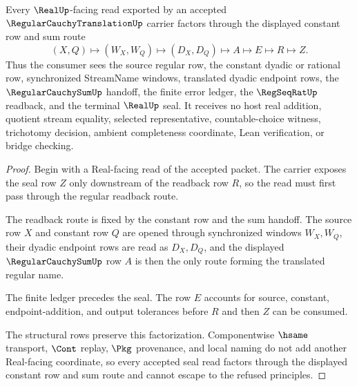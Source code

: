\begin{theorem}
\label{thm:regular-cauchy-translation-real-seal-handoff}
Every $\RealUp$-facing read exported by an accepted $\RegularCauchyTranslationUp$ carrier factors through the displayed constant row and sum route
$$
(X,Q)\longmapsto (W_X,W_Q)\longmapsto (D_X,D_Q)\longmapsto A\longmapsto E\longmapsto R\longmapsto Z .
$$
Thus the consumer sees the source regular row, the constant dyadic or rational row, synchronized StreamName windows, translated dyadic endpoint rows, the $\RegularCauchySumUp$ handoff, the finite error ledger, the $\RegSeqRatUp$ readback, and the terminal $\RealUp$ seal. It receives no host real addition, quotient stream equality, selected representative, countable-choice witness, trichotomy decision, ambient completeness coordinate, Lean verification, or bridge checking.
\end{theorem}
\begin{proof}
Begin with a Real-facing read of the accepted packet. The carrier exposes the seal row $Z$ only downstream of the readback row $R$, so the read must first pass through the regular readback route.

The readback route is fixed by the constant row and the sum handoff. The source row $X$ and constant row $Q$ are opened through synchronized windows $W_X,W_Q$, their dyadic endpoint rows are read as $D_X,D_Q$, and the displayed $\RegularCauchySumUp$ row $A$ is then the only route forming the translated regular name.

The finite ledger precedes the seal. The row $E$ accounts for source, constant, endpoint-addition, and output tolerances before $R$ and then $Z$ can be consumed.

The structural rows preserve this factorization. Componentwise $\hsame$ transport, $\Cont$ replay, $\Pkg$ provenance, and local naming do not add another Real-facing coordinate, so every accepted seal read factors through the displayed constant row and sum route and cannot escape to the refused principles.
\end{proof}


